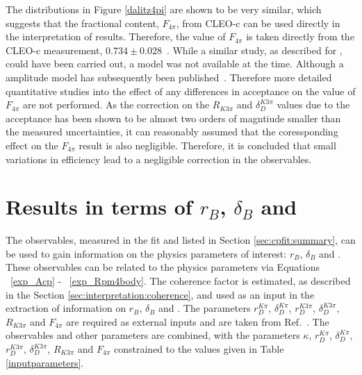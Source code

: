 The distributions in Figure \ref{dalitz4pi} are shown to be very similar, which suggests that the fractional \CP content, $F_{4\pi}$, from CLEO-c can be used directly in the interpretation of \lhcb results. Therefore, the value of $F_{4\pi}$ is taken directly from the CLEO-c measurement, $0.734 \pm 0.028$~\cite{charm4pi}. While a similar study, as described for \decay{\Dz}{\Km\pip\pim\pip}, could have been carried out, a model was not available at the time. Although a \decay{\Dz}{\pim\pip\pim\pip} amplitude model has subsequently been published~\cite{4piamplitude}. Therefore more detailed quantitative studies into the effect of any differences in acceptance on the value of $F_{4\pi}$ are not performed. As the correction on the $R_{K3\pi}$ and $\delta_D^{K3\pi}$ values due to the \lhcb acceptance has been shown to be almost two orders of magntiude smaller than the measured uncertainties, it can reasonably assumed that the coressponding effect on the $F_{4\pi}$ result is also negligible. Therefore, it is concluded that small variations in efficiency lead to a negligible correction in the observables. 


\section{Results in terms of $r_B$, $\delta_B$ and \Pgamma}
\label{sec:interpretation:gammadini}

The \CP observables, measured in the \CP fit and listed in Section \ref{sec:cpfit:summary}, can be used to gain information on the physics parameters of interest: $r_B$, $\delta_B$ and \Pgamma. These observables can be related to the physics parameters via Equations ~\ref{exp_Acp} - ~\ref{exp_Rpm4body}. The coherence factor is estimated, as described in the Section \ref{sec:interpretation:coherence}, and used as an input in the extraction of information on $r_B$, $\delta_B$ and \Pgamma. The parameters $r_D^{K\pi}$, $\delta_D^{K\pi}$, $r_D^{K3\pi}$, $\delta_D^{K3\pi}$, $R_{K3\pi}$ and $F_{4\pi}$ are required as external inputs and are taken from Ref.~\cite{HFAG,charmk3pi,charmk3pi_errata,LHCb-PAPER-2015-057,charm4pi}. The \CP observables and other parameters are combined, with the parameters $\kappa$, $r_D^{K\pi}$, $\delta_D^{K\pi}$, $r_D^{K3\pi}$, $\delta_D^{K3\pi}$, $R_{K3\pi}$ and $F_{4\pi}$ constrained to the values given in Table \ref{inputparameters}. 

